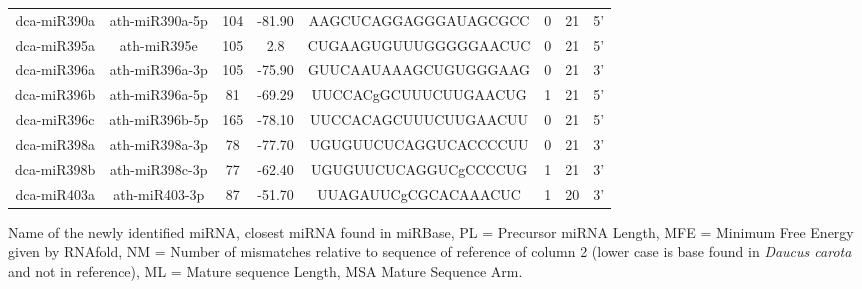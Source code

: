 \documentclass[preview=true,varwidth=\maxdimen]{standalone}
\begin{document}
\begin{table}
\begin{tabular}{c c c c c c c c}
dca-miR390a & ath-miR390a-5p & 104 & -81.90 & AAGCUCAGGAGGGAUAGCGCC & 0 & 21 & 5'\\
dca-miR395a & ath-miR395e & 105 & 2.8 & CUGAAGUGUUUGGGGGAACUC & 0 & 21 & 5'\\
dca-miR396a & ath-miR396a-3p & 105 & -75.90 & GUUCAAUAAAGCUGUGGGAAG & 0 & 21 & 3'\\
dca-miR396b & ath-miR396a-5p & 81 & -69.29 & UUCCACgGCUUUCUUGAACUG & 1 & 21 & 5'\\
dca-miR396c & ath-miR396b-5p & 165 & -78.10 & UUCCACAGCUUUCUUGAACUU & 0 & 21 & 5'\\
dca-miR398a & ath-miR398a-3p & 78 & -77.70 & UGUGUUCUCAGGUCACCCCUU & 0 & 21 & 3'\\
dca-miR398b & ath-miR398c-3p & 77 & -62.40 & UGUGUUCUCAGGUCgCCCCUG & 1 & 21 & 3'\\
dca-miR403a & ath-miR403-3p & 87 & -51.70 & UUAGAUUCgCGCACAAACUC & 1 & 20 & 3'\\
\bottomrule
\end{tabular}
\label{tab:template}
\end{table}
\begin{minipage}{16cm}
Name of the newly identified miRNA, closest miRNA found in miRBase, PL = Precursor miRNA Length, MFE = Minimum Free Energy given by RNAfold, NM = Number of mismatches relative to sequence of reference of column 2 (lower case is base found in \emph{Daucus carota} and not in reference), ML = Mature sequence Length, MSA Mature Sequence Arm.\end{minipage}
\end{document}
